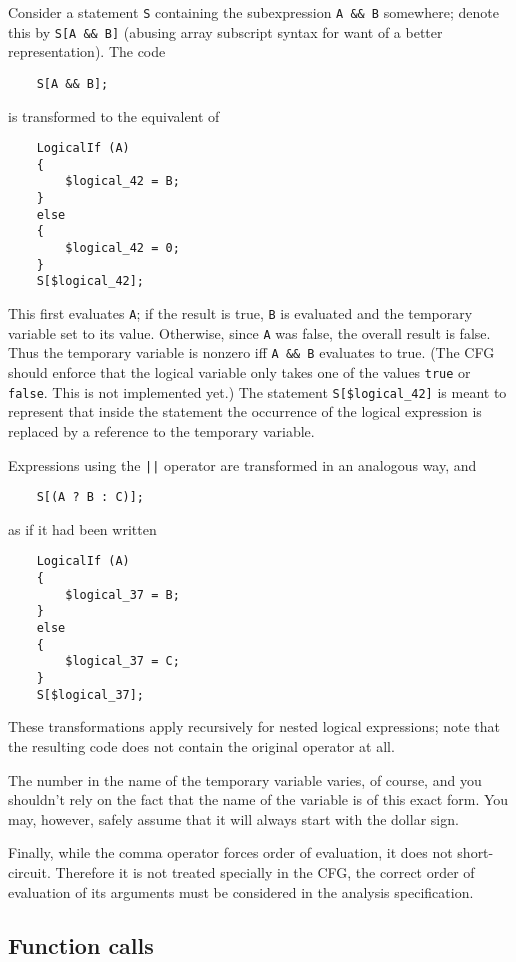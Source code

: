 \documentclass[12pt]{article}
\begin{document}
Consider a statement \lstinline|S| containing the subexpression
\lstinline|A && B| somewhere; denote this by \lstinline|S[A && B]|
(abusing array subscript syntax for want of a better
representation). The code
\begin{lstlisting}
    S[A && B];
\end{lstlisting}
is transformed to the equivalent of
\begin{lstlisting}
    LogicalIf (A)
    {
        $logical_42 = B;
    }
    else
    {
        $logical_42 = 0;
    }
    S[$logical_42];
\end{lstlisting}
This first evaluates \lstinline|A|; if the result is true,
\lstinline|B| is evaluated and the temporary variable set to its
value. Otherwise, since \lstinline|A| was false, the overall result
is false. Thus the temporary variable is nonzero iff \lstinline|A && B|
evaluates to true. (The CFG should enforce that the logical
variable only takes one of the values \lstinline|true| or
\lstinline|false|. This is not implemented yet.) The statement
\lstinline|S[$logical_42]| %
is meant to represent that inside the statement the occurrence of
the logical expression is replaced by a reference to the temporary
variable.

Expressions using the \lstinline&||& operator are transformed in an
analogous way, and
\begin{lstlisting}
    S[(A ? B : C)];
\end{lstlisting}
as if it had been written
\begin{lstlisting}
    LogicalIf (A)
    {
        $logical_37 = B;
    }
    else
    {
        $logical_37 = C;
    }
    S[$logical_37];
\end{lstlisting}

These transformations apply recursively for nested logical
expressions; note that the resulting code does not contain the
original operator at all.

The number in the name of the temporary variable varies, of course,
and you shouldn't rely on the fact that the name of the variable is
of this exact form. You may, however, safely assume that it will
always start with the dollar sign.

Finally, while the comma operator forces order of evaluation, it
does not short-circuit. Therefore it is not treated specially in the
CFG, the correct order of evaluation of its arguments must be
considered in the analysis specification.

\subsection{Function calls}
\end{document}
